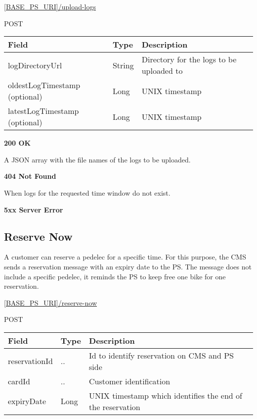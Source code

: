 \url{[BASE_PS_URI]/upload-logs}

 POST

\begin{table}[!h]
\vspace{-7mm}
\begin{tabularx}{\linewidth}{ | l | l | X | }
  \hline
  \rowcolor{table-head}
  Field & Type & Description \\
  \hline
  logDirectoryUrl & String 		& Directory for the logs to be uploaded to \\
  oldestLogTimestamp (optional) & Long	& UNIX timestamp \\
  latestLogTimestamp (optional)	& Long & UNIX timestamp \\
  \hline
\end{tabularx}
\end{table}

 \textbf{200 OK}

A JSON array with the file names of the logs to be uploaded.

 \textbf{404 Not Found}

When logs for the requested time window do not exist.

\textbf{5xx Server Error}

\subsection{Reserve Now}

A customer can reserve a pedelec for a specific time. For this purpose, the \acs{CMS} sends a reservation message with an expiry date to the \acs{PS}. The message does not include a specific pedelec, it reminds the \acs{PS} to keep free one bike for one reservation.

 \url{[BASE_PS_URI]/reserve-now}

 POST

\begin{table}[!h]
\vspace{-7mm}
\begin{tabularx}{\linewidth}{ | l | l | X | }
  \hline
  \rowcolor{table-head}
  Field & Type & Description \\
  \hline
  reservationId & .. & Id to identify reservation on \acs{CMS} and \acs{PS} side\\
  cardId 	& .. & Customer identification \\
  expiryDate		& Long & UNIX timestamp which identifies the end of the reservation \\
  \hline
\end{tabularx}
\end{table}

